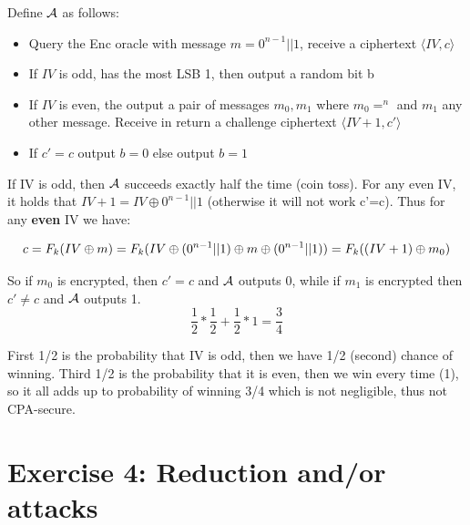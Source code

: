 \documentclass[12pt]{article}
\begin{document}
Define $\mathcal{A}$ as follows:
\begin{itemize}
\item Query the Enc oracle with message $m=0^{n-1}||1$, receive a ciphertext $\langle IV, c\rangle $
\item If $IV$ is odd, has the most LSB 1, then output a random bit b
\item If $IV$ is even, the output a pair of messages $m_0, m_1$ where $m_0=^n$ and $m_1$ any other message. Receive in return a challenge ciphertext $\langle IV+1,c' \rangle$
\item If $c'=c$ output $b=0$ else output $b=1$
\end{itemize}

If IV is odd, then $\mathcal{A}$ succeeds exactly half the time (coin toss). For any even IV, it holds that $IV+1=IV \oplus 0^{n-1}||1$ (otherwise it will not work c'=c). Thus for any \textbf{even} IV we have:

\begin{equation*}
c = F_k(IV \oplus m) = F_k(IV \oplus (0^{n-1}||1) \oplus m \oplus (0^{n-1}||1)) = F_k((IV+1) \oplus m_0)
\end{equation*}

So if $m_0$ is encrypted, then $c'=c$ and $\mathcal{A}$ outputs 0, while if $m_1$ is encrypted then $c'\neq c$ and $\mathcal{A}$ outputs 1.
\begin{equation*}
\frac12 * \frac12 + \frac12 * 1 = \frac34
\end{equation*}

First 1/2 is the probability that IV is odd, then we have 1/2 (second) chance of winning. Third 1/2 is the probability that it is even, then we win every time (1), so it all adds up to probability of winning 3/4 which is not negligible, thus not CPA-secure.
\newpage

\section{Exercise 4: Reduction and/or attacks}
\end{document}

